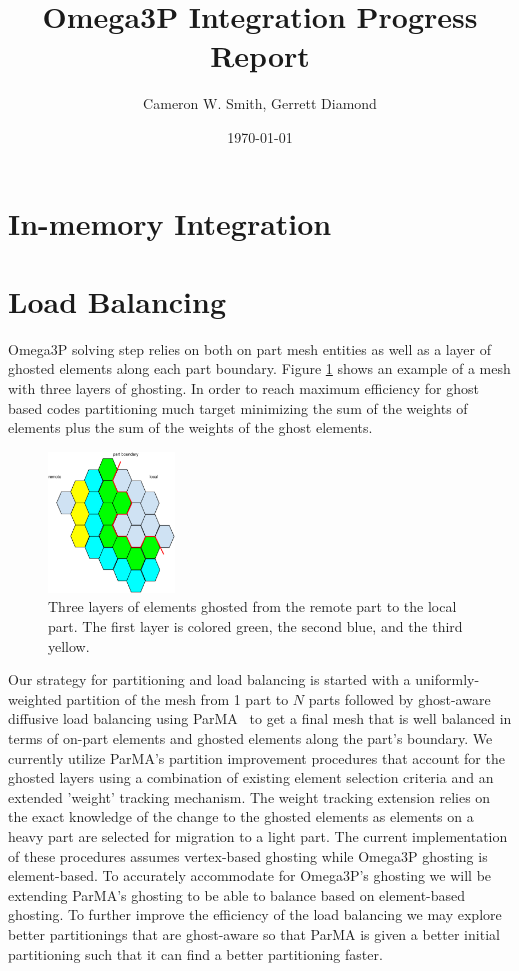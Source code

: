 \documentclass[a4paper]{article}
\title{Omega3P Integration Progress Report}
\author{Cameron W. Smith, Gerrett Diamond}
\date{\today}
\begin{document}
\maketitle

\section{In-memory Integration}



\section{Load Balancing}

Omega3P solving step relies on both on part mesh entities as well as a layer of 
ghosted elements along each part boundary. Figure \ref{fig:ghost3} shows an 
example of a mesh with three layers of ghosting. In order to reach maximum efficiency
for ghost based codes partitioning much target minimizing the sum of the 
weights of elements plus the sum of the weights of the ghost elements. 

\begin{figure}[ht]
\centering
\includegraphics[width=0.3\textwidth]{ghostingExample.eps} 
\caption{\label{fig:ghost3} Three layers of elements ghosted from the remote part to the local part.  The first layer is colored green, the second blue, and the third yellow.}
\end{figure}

\noindent Our strategy for partitioning and load balancing is started with a 
uniformly-weighted 
partition of the mesh from 1 part to $N$ parts followed by ghost-aware diffusive load 
balancing using ParMA~\cite{SmithParma2015} to get a final mesh that is well balanced 
in terms of on-part elements and ghosted elements along the part's boundary. We 
currently utilize ParMA's partition improvement procedures that account for the 
ghosted layers using a combination of existing element selection criteria and an 
extended 'weight' tracking mechanism.  The weight tracking extension relies on the 
exact knowledge of the change to the ghosted elements as elements on a heavy part 
are selected for migration to a light part. The current implementation of these 
procedures assumes vertex-based ghosting while Omega3P ghosting is element-based. 
To accurately accommodate for Omega3P's ghosting we will be extending ParMA's 
ghosting to be able to balance based on element-based ghosting. To further improve 
the efficiency of the load balancing we may explore better partitionings 
that are ghost-aware so that ParMA is given a better initial partitioning such that it 
can find a better partitioning faster.
\end{document}
